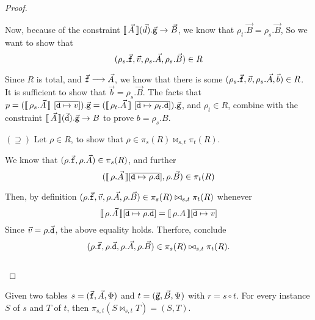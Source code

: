 \begin{proof}
\begin{enumerate}[align=left]
  \end{enumerate}

  Now, because of the constraint
  $\llbracket\,\vec A\,\rrbracket(\vec d).\vec{\texttt{g}} \to \vec B$, we know that
  $\rho_t.\vec B = \rho_s.\vec B$, So we want to show
  that
  \[(\rho_s.\vec{\texttt{f}}, \vec v, \rho_s.\vec A, \rho_s.\vec B) \in
    R\]

  Since $R$ is total, and $\vec{\texttt{f}} \longrightarrow \vec A$, we
  know that there is some
  $(\rho_s.\vec{\texttt{f}}, \vec v, \rho_s.\vec A, \vec b) \in R$. It is
  sufficient to show that $\vec b = \rho_s.\vec B$.  The facts that
  $p = (\llbracket\,\rho_s.\vec A\,\rrbracket~[\overline{\texttt{d} \mapsto
    v}]).\vec{\texttt{g}} = (\llbracket\,\rho_t.\vec A\,\rrbracket~[\overline{\texttt{d}
    \mapsto \rho_t.\texttt{d}}]).\vec{\texttt{g}}$, and $\rho_t \in R$,
  combine with the constraint
  $\llbracket\,\vec A\,\rrbracket(\vec{\texttt{d}}).\vec{\texttt{g}} \to B$ to
  prove $b = \rho_s.B$. \hfill \checkmark

\item[$(\supseteq)$] Let $\rho \in R$, to show
  that $\rho \in \pi_s(R) \bowtie_{s,t} \pi_t(R)$.

  We know that $(\rho.\vec{\texttt{f}}, \rho.\vec A) \in \pi_s(R)$, and further
  \[(\llbracket\,\rho.\vec A\,\rrbracket[\overline{\texttt{d} \mapsto \rho.\texttt{d}}],\rho.\vec B) \in
    \pi_t(R)\]

  Then, by definition
  $(\rho.\vec{\texttt{f}}, \vec v, \rho.\vec A, \rho.\vec B) \in \pi_s(R)
  \bowtie_{s,t} \pi_t(R)$ whenever
  \[\llbracket\,\rho.\vec A\,\rrbracket[\overline{\texttt{d} \mapsto \rho.\texttt{d}}]
    = \llbracket\,\rho.A\,\rrbracket[\overline{\texttt{d} \mapsto v}]\] Since
  $\vec v = \rho.\vec{\texttt{d}}$, the above equality holds. Therfore,
  conclude
  \[(\rho.\vec{\texttt{f}}, \rho.\vec{\texttt{d}}, \rho.\vec A, \rho.\vec B) \in \pi_s(R)
    \bowtie_{s,t} \pi_t(R).\]
  \mbox{} \hfill \checkmark\\\mbox{}
\end{proof}

\begin{proposition}
  \label{prop:proj-join}
  Given two tables $s = (\vec{\texttt{f}},\vec A, \Phi)$ and
  $t = (\vec{\texttt{g}},\vec B, \Psi)$ with $r = s \circ t$. For every
  instance $S$ of $s$ and $T$ of $t$, then
  $\pi_{s,t}(S \bowtie_{s,t} T) = (S,T)$.
\end{proposition}

